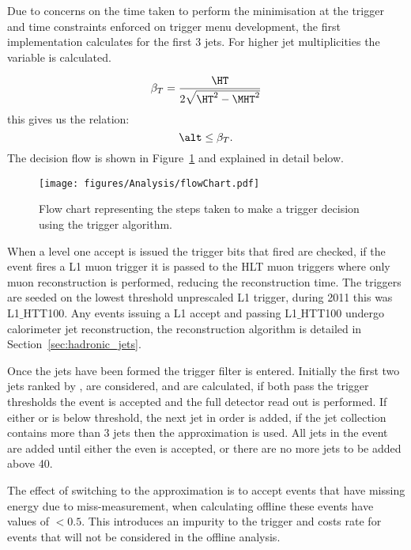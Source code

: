 Due to concerns on the time taken to perform the \dHT minimisation at the 
trigger and time constraints enforced on trigger menu development, the first 
implementation calculates \alt for the first 3 jets. For higher jet 
multiplicities the variable \bt is calculated.

\begin{equation}
  \beta_{T} = \frac{\HT}{2\sqrt{\HT^{2} - \MHT^{2}}}
  \label{eqn:betaT}
\end{equation}
this gives us the relation:
\begin{equation}
  \alt \leq \beta_{T}.
\end{equation}
The decision flow is shown in Figure~\ref{fig:figures_Analysis_flowChart} and 
explained in detail below.

\begin{figure}[ht|]
  \centering
    \texttt{[image: figures/Analysis/flowChart.pdf]}
  \caption{Flow chart representing the steps taken to make a trigger decision 
  using the \alt trigger algorithm.}
  \label{fig:figures_Analysis_flowChart}
\end{figure}


When a level one accept is issued the trigger bits that fired are checked, if 
the event fires a L1 muon trigger it is passed to the HLT muon triggers where 
only muon reconstruction is performed, reducing the reconstruction time. The 
\alt triggers are seeded on the lowest threshold unprescaled L1 \HT trigger, 
during 2011 this was L1$\_$HTT100. Any events issuing a L1 accept and passing 
L1$\_$HTT100 undergo calorimeter jet reconstruction, the reconstruction 
algorithm is detailed in Section~\ref{sec:hadronic_jets}.

Once the jets have been formed the trigger filter is entered. Initially the 
first two jets ranked by \ET, are considered, \HT and \alt are calculated, if 
both pass the trigger thresholds the event is accepted and the full detector 
read out is performed. If either \HT or \alt is below threshold, the next jet 
in \ET order is added, if the jet collection contains more than 3 jets then the 
\bt approximation is used. All jets in the event are added until either the 
even is accepted, or there are no more jets to be added above \unit{40}{\GeV}.

The effect of switching to the \bt approximation is to accept events that have 
missing energy due to miss-measurement, when calculating \alt offline these 
events have values of \alt $< 0.5$. This introduces an impurity to the trigger 
and costs rate for events that will not be considered in the offline analysis.

